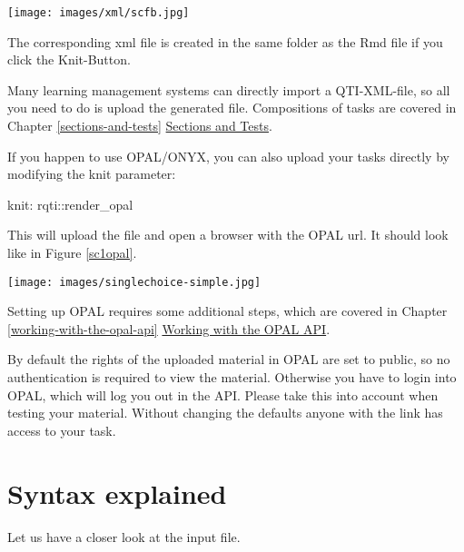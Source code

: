 \documentclass[twoside]{tufte-book}
\newenvironment{Shaded}{}{}
\newcommand{\NormalTok}[1]{#1}
\newcommand{\SpecialCharTok}[1]{\textcolor[rgb]{0.25,0.44,0.63}{#1}}
\begin{document}
\begin{figure*}
\centering
\texttt{[image: images/xml/scfb.jpg]}
\caption{\label{sc1qtijs}Preview of single choice task with feedback rendered by QTIJS}
\end{figure*}

The corresponding xml file is created in the same folder as the Rmd file if you click the Knit-Button.

Many learning management systems can directly import a QTI-XML-file, so all you need to do is upload the generated file. Compositions of tasks are covered in Chapter \ref{sections-and-tests} \href{section.html}{Sections and Tests}.

If you happen to use OPAL/ONYX, you can also upload your tasks directly by modifying the knit parameter:

\begin{Shaded}
\begin{Highlighting}[]
\NormalTok{knit}\SpecialCharTok{:}\NormalTok{ rqti}\SpecialCharTok{::}\NormalTok{render\_opal}
\end{Highlighting}
\end{Shaded}

This will upload the file and open a browser with the OPAL url. It should look like in Figure \ref{sc1opal}.

\begin{figure*}
\centering
\texttt{[image: images/singlechoice-simple.jpg]}
\caption{\label{sc1opal}Single choice task rendered in OPAL}
\end{figure*}

Setting up OPAL requires some additional steps, which are covered in Chapter \ref{working-with-the-opal-api} \href{api_opal.html}{Working with the OPAL API}.

By default the rights of the uploaded material in OPAL are set to public, so no authentication is required to view the material. Otherwise you have to login into OPAL, which will log you out in the API. Please take this into account when testing your material. Without changing the defaults anyone with the link has access to your task.

\section{Syntax explained}\label{syntax-explained}

Let us have a closer look at the input file.
\end{document}

